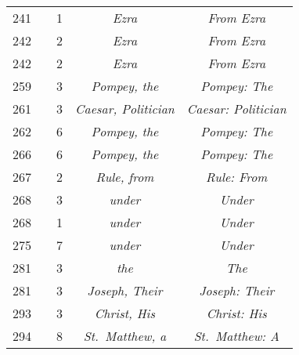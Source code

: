\documentclass[a4paper,11pt]{article}
\begin{document}
\begin{center}
\begin{tabular}{|c|c|c|c|c|}
    241 & &  1 & \textit{Ezra} & \textit{From Ezra} \\
    242 & &  2 & \textit{Ezra} & \textit{From Ezra} \\
    242 & &  2 & \textit{Ezra} & \textit{From Ezra} \\
    259 & &  3 & \textit{Pompey, the} & \textit{Pompey: The} \\
    261 & &  3 & \textit{Caesar, Politician}
           & \textit{Caesar: Politician} \\
    262 & &  6 & \textit{Pompey, the} & \textit{Pompey: The} \\
    266 & &  6 & \textit{Pompey, the} & \textit{Pompey: The} \\
    267 & &  2 & \textit{Rule, from} & \textit{Rule: From} \\
    268 & &  3 & \textit{under} & \textit{Under} \\
    268 & &  1 & \textit{under} & \textit{Under} \\
    275 & &  7 & \textit{under} & \textit{Under} \\
    281 & &  3 & \textit{the} & \textit{The} \\
    281 & &  3 & \textit{Joseph, Their} & \textit{Joseph: Their} \\
    293 & &  3 & \textit{Christ, His} & \textit{Christ: His} \\
    294 & &  8 & \textit{St.~Matthew, a} & \textit{St.~Matthew: A} \\
    \hline
  \end{tabular}






\end{center}
\end{document}
